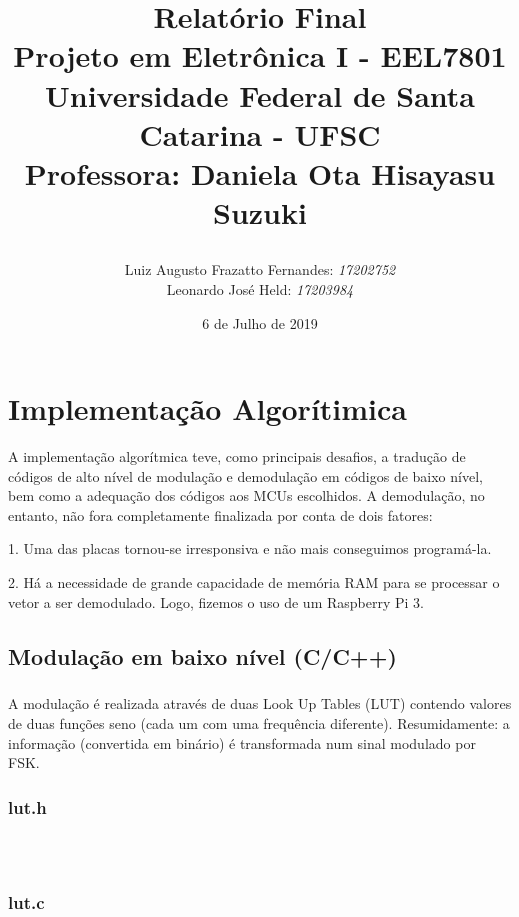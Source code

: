 \documentclass[11pt,a4paper]{report}
\title{Relatório Final  \\
	Projeto em Eletrônica I - EEL7801 \\ \vfill
	\normalsize{Universidade Federal de Santa Catarina - UFSC \\
		Professora: Daniela Ota Hisayasu Suzuki}
	\author{
		{Luiz Augusto Frazatto Fernandes: \it{17202752}} \\
		{Leonardo José Held: \it{17203984}}
}
}
\date{6 de Julho de 2019}
\begin{document}
	\maketitle
	\setcounter{chapter}{0}

	
	\chapter{Implementação Algorítimica}
		A implementação algorítmica teve, como principais desafios, a tradução de códigos de alto nível de modulação e demodulação em códigos de baixo nível, bem como a adequação dos códigos aos MCUs escolhidos. A demodulação, no entanto, não fora completamente finalizada por conta de dois fatores:
		\begin{list}
			\item[1.] Uma das placas tornou-se irresponsiva e não mais conseguimos programá-la.
			\item[2.] Há a necessidade de grande capacidade de memória RAM para se processar o vetor a ser demodulado. Logo, fizemos o uso de um Raspberry Pi 3.
		\end{list}
		
	\section{Modulação em baixo nível (C/C++)}
	\paragraph{}
		A modulação é realizada através de duas Look Up Tables (LUT) contendo valores de duas funções seno (cada um com uma frequência diferente). Resumidamente: a informação (convertida em binário) é transformada num sinal modulado por FSK.
	\subsection{lut.h}
		\begin{verbatim}
		
		
		\end{verbatim}
		
	\subsection{lut.c}
		\begin{verbatim}
		
		
		\end{verbatim}
		
\end{document}
